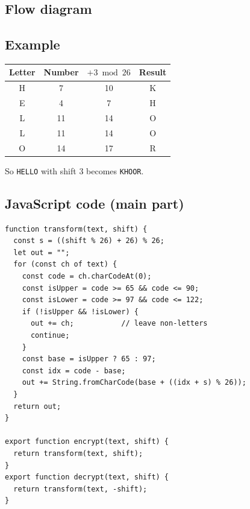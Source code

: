 \documentclass[12pt,a4paper]{article}
\newcommand{\flowarrow}{-{Stealth}, thick, color=black!60}
\begin{document}
\subsection{Flow diagram}
\begin{center}
\end{center}

\subsection{Example}
\begin{center}
\begin{tabular}{@{}cccc@{}}
\toprule
Letter & Number & \(+3 \bmod 26\) & Result \\
\midrule
H & 7 & 10 & K \\
E & 4 & 7 & H \\
L & 11 & 14 & O \\
L & 11 & 14 & O \\
O & 14 & 17 & R \\
\bottomrule
\end{tabular}
\end{center}
So \texttt{HELLO} with shift \(3\) becomes \texttt{KHOOR}.

\subsection{JavaScript code (main part)}
\begin{lstlisting}
function transform(text, shift) {
  const s = ((shift % 26) + 26) % 26;
  let out = "";
  for (const ch of text) {
    const code = ch.charCodeAt(0);
    const isUpper = code >= 65 && code <= 90;
    const isLower = code >= 97 && code <= 122;
    if (!isUpper && !isLower) {
      out += ch;           // leave non-letters
      continue;
    }
    const base = isUpper ? 65 : 97;
    const idx = code - base;
    out += String.fromCharCode(base + ((idx + s) % 26));
  }
  return out;
}

export function encrypt(text, shift) {
  return transform(text, shift);
}
export function decrypt(text, shift) {
  return transform(text, -shift);
}
\end{lstlisting}
\end{document}
